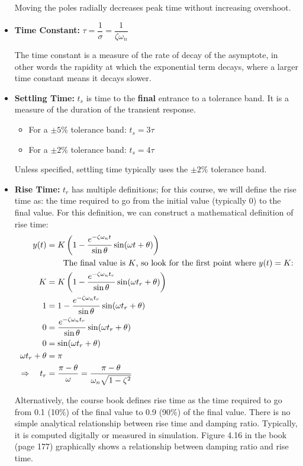 \documentclass{book}
\newcommand{\wt}{\omega t}
\newcommand{\wnt}{\omega_n t}
\begin{document}
\begin{itemize}
\begin{minipage}{0.49\textwidth}
\begin{center}
			Moving the poles radially decreases peak time without increasing overshoot.
		\end{center}
	\end{minipage}

	\item \textbf{Time Constant:} $ \tau = \dfrac{1}{\sigma} = \dfrac{1}{\zeta\omega_n} $
	
	The time constant is a measure of the rate of decay of the asymptote, in other words the rapidity at which the exponential term decays, where a larger time constant means it decays slower.
	
	\item \textbf{Settling Time:} $ t_s $ is time to the \textbf{final} entrance to a tolerance band. It is a measure of the duration of the transient response.
	\begin{itemize}
		\item For a $ \pm 5\% $ tolerance band: $ t_s = 3\tau $
		\item For a $ \pm 2\% $ tolerance band: $ t_s = 4\tau $
	\end{itemize}
	Unless specified, settling time typically uses the $ \pm2\% $ tolerance band.

	\item \textbf{Rise Time:} $ t_r $ has multiple definitions; for this course, we will define the rise time as: the time required to go from the initial value (typically 0) to the final value. For this definition, we can construct a mathematical definition of rise time:
	\begin{align*}
	y(t) &= K \left( 1 - \frac{e^{-\zeta\wnt}}{\sin\theta} \sin(\wt+\theta) \right) \\
	&\qquad \text{The final value is $ K $, so look for the first point where $ y(t)=K $:}\\
	K & = K \left( 1 - \frac{e^{-\zeta\wnt_r}}{\sin\theta} \sin(\wt_r+\theta) \right) \\
	1 & = 1 - \frac{e^{-\zeta\wnt_r}}{\sin\theta} \sin(\wt_r+\theta) \\
	0 & = \frac{e^{-\zeta\wnt_r}}{\sin\theta} \sin(\wt_r+\theta) \\
	0 & = \sin(\wt_r+\theta) \\
	\wt_r+\theta & = \pi \\
	\Rightarrow\quad t_r & = \frac{\pi-\theta}{\omega} = \frac{\pi-\theta}{\omega_n\sqrt{1-\zeta^2}}
	\end{align*}
	
	Alternatively, the course book defines rise time as the time required to go from 0.1 (10\%) of the final value to 0.9 (90\%) of the final value. There is no simple analytical relationship between rise time and damping ratio. Typically, it is computed digitally or measured in simulation. Figure 4.16 in the book (page 177) graphically shows a relationship between damping ratio and rise time. 
	
\end{itemize}
\end{document}
